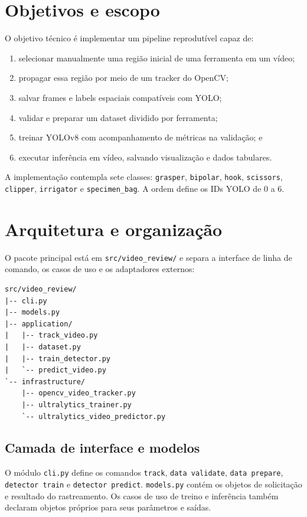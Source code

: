 \documentclass[12pt,a4paper]{article}
\begin{document}
\section{Objetivos e escopo}

O objetivo técnico é implementar um pipeline reprodutível capaz de:
\begin{enumerate}
  \item selecionar manualmente uma região inicial de uma ferramenta em um vídeo;
  \item propagar essa região por meio de um tracker do OpenCV;
  \item salvar frames e labels espaciais compatíveis com YOLO;
  \item validar e preparar um dataset dividido por ferramenta;
  \item treinar YOLOv8 com acompanhamento de métricas na validação; e
  \item executar inferência em vídeo, salvando visualização e dados tabulares.
\end{enumerate}

A implementação contempla sete classes: \texttt{grasper}, \texttt{bipolar}, \texttt{hook}, \texttt{scissors}, \texttt{clipper}, \texttt{irrigator} e \texttt{specimen\_bag}. A ordem define os IDs YOLO de 0 a 6.

\section{Arquitetura e organização}

O pacote principal está em \texttt{src/video\_review/} e separa a interface de linha de comando, os casos de uso e os adaptadores externos:

\begin{lstlisting}[style=terminal]
src/video_review/
|-- cli.py
|-- models.py
|-- application/
|   |-- track_video.py
|   |-- dataset.py
|   |-- train_detector.py
|   `-- predict_video.py
`-- infrastructure/
    |-- opencv_video_tracker.py
    |-- ultralytics_trainer.py
    `-- ultralytics_video_predictor.py
\end{lstlisting}

\subsection{Camada de interface e modelos}

O módulo \texttt{cli.py} define os comandos \texttt{track}, \texttt{data validate}, \texttt{data prepare}, \texttt{detector train} e \texttt{detector predict}. \texttt{models.py} contém os objetos de solicitação e resultado do rastreamento. Os casos de uso de treino e inferência também declaram objetos próprios para seus parâmetros e saídas.
\end{document}
